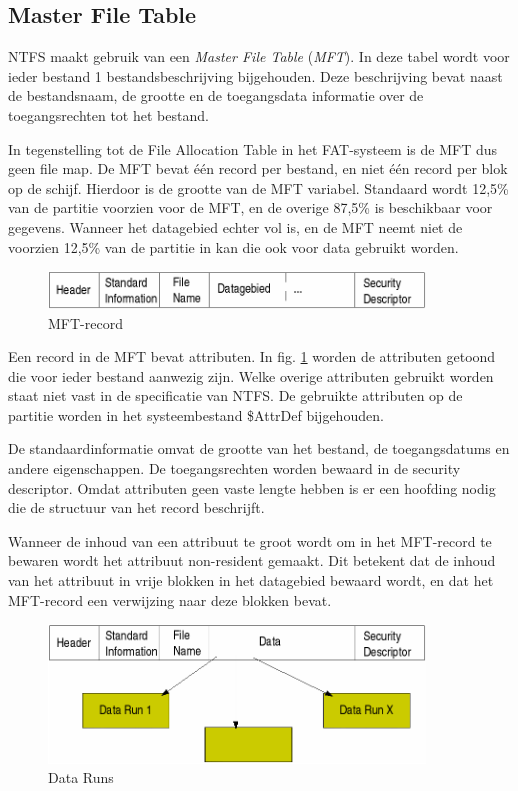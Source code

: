 \subsection{Master File Table}

NTFS maakt gebruik van een \emph{Master File
Table} (\emph{MFT}). In deze tabel wordt
voor ieder bestand 1 bestandsbeschrijving bijgehouden. Deze
beschrijving bevat naast de bestandsnaam, de grootte en de
toegangsdata informatie over de toegangsrechten tot het
bestand.

In tegenstelling tot de File Allocation Table in het FAT-systeem
is de MFT dus geen file map. De MFT bevat \'e\'en record per bestand, en
niet \'e\'en record per blok op de schijf. Hierdoor is de grootte van de
MFT variabel. Standaard wordt 12,5\% van de partitie voorzien voor de
MFT, en de overige 87,5\% is beschikbaar voor gegevens. Wanneer het
datagebied echter vol is, en de MFT neemt niet de voorzien 12,5\% van
de partitie in kan die ook voor data gebruikt worden.

\begin{figure}
\begin{center}
\includegraphics[width=100mm]{images/fig0416.png}
\caption{MFT-record}
\label{mftrecord}
\end{center}
\end{figure}

Een record in de MFT bevat attributen. In fig. \ref{mftrecord} worden de
attributen getoond die voor ieder bestand aanwezig zijn. Welke overige attributen
gebruikt worden staat niet vast in de specificatie van NTFS. De
gebruikte attributen op de partitie worden in het systeembestand
\$AttrDef bijgehouden.

De standaardinformatie omvat de grootte van het bestand, de
toegangsdatums en andere eigenschappen. De toegangsrechten worden
bewaard in de security descriptor. Omdat attributen geen vaste lengte
hebben is er een hoofding nodig die de structuur van het record
beschrijft.

Wanneer de inhoud van een attribuut te groot wordt om in het
MFT-record te bewaren wordt het attribuut non-resident gemaakt. Dit
betekent dat de inhoud van het attribuut in vrije blokken in het
datagebied bewaard wordt, en dat het MFT-record een verwijzing naar
deze blokken bevat.

\begin{figure}
\begin{center}
\includegraphics[width=100mm]{images/fig0417.png}
\caption{Data Runs}
\label{dataruns}
\end{center}
\end{figure}

